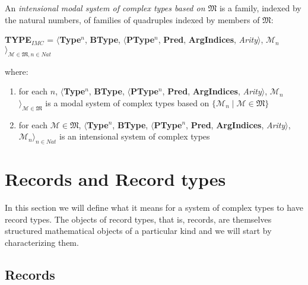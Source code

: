 An {\it intensional modal system of complex types based on $\mathfrak{M}$\/} is a family,
indexed by the natural numbers, of families of quadruples indexed by
members of $\mathfrak{M}$:
\begin{display}
{\bf TYPE$_\mathit{IMC}$} = $\langle${\bf Type}$^n$, {\bf BType},
$\langle$\textbf{PType}$^n$, {\bf Pred}, \textbf{ArgIndices}, {\it
  Arity\/}$\rangle$, $\mathscr{M}_n$$\rangle_{\mathscr{M}\in\mathfrak{M},n\in\mathit{Nat}}$
\end{display}
where:
\begin{enumerate} 
 
\item for each $n$, $\langle${\bf Type}$^n$, {\bf BType},
$\langle$\textbf{PType}$^n$, {\bf Pred}, \textbf{ArgIndices}, {\it
  Arity\/}$\rangle$, $\mathscr{M}_n$$\rangle_{\mathscr{M}\in\mathfrak{M}}$ is a modal
  system of complex types based on $\{\mathscr{M}_n\mid \mathscr{M}\in\mathfrak{M}\}$ 
 
\item for each $\mathscr{M}\in\mathfrak{M}$, $\langle${\bf Type}$^n$, {\bf BType},
$\langle$\textbf{PType}$^n$, {\bf Pred}, \textbf{ArgIndices}, {\it
  Arity\/}$\rangle$, $\mathscr{M}_n$$\rangle_{n\in\mathit{Nat}}$ is an
  intensional system of complex types
 
\end{enumerate} 
 


\section{Records and Record types}
\label{app:rectypes}

In this section we will define what it means for a system of complex
types to have record types.  The objects of record types, that is,
records, are themselves structured mathematical objects of a
particular kind and we will
start by characterizing them.

\subsection{Records}
\label{app:rec}


